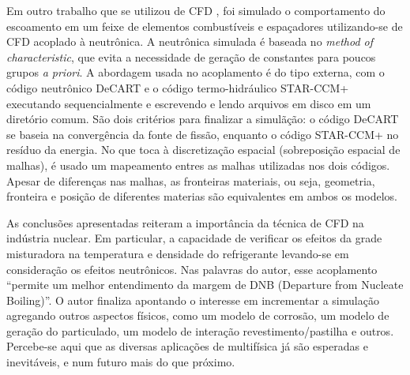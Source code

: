 Em outro trabalho que se utilizou de CFD \cite{Yan2011}, foi simulado o comportamento do escoamento em um feixe de elementos 
combustíveis e espaçadores utilizando-se de CFD acoplado à neutrônica. A neutrônica 
simulada é baseada no \textit{method of characteristic}, que evita a necessidade de geração 
de constantes para poucos grupos \textit{a priori}. A abordagem usada no 
acoplamento é do tipo externa, com o código neutrônico DeCART e o código termo-hidráulico 
STAR-CCM+ executando sequencialmente e escrevendo e lendo arquivos em disco em um 
diretório comum. São dois critérios para finalizar a simulãção: o código DeCART se baseia 
na convergência da fonte de fissão, enquanto o código STAR-CCM+ no resíduo da energia. No que toca à 
discretização espacial (sobreposição espacial de malhas), é usado um mapeamento entres as malhas 
utilizadas nos dois códigos. Apesar de diferenças nas malhas, as fronteiras materiais, ou seja, geometria, 
fronteira e posição de diferentes materias são equivalentes em ambos os modelos.

As conclusões apresentadas reiteram a importância da técnica de CFD na indústria nuclear. Em particular, 
a capacidade de verificar os efeitos da grade misturadora na temperatura e densidade do refrigerante 
levando-se em consideração os efeitos neutrônicos. Nas palavras do autor, esse acoplamento 
``permite um melhor entendimento da margem de DNB (Departure from Nucleate Boiling)''.
O autor finaliza apontando o interesse em incrementar a simulação 
agregando outros aspectos físicos, como um modelo de corrosão, um modelo de geração do particulado, 
um modelo de interação revestimento/pastilha e outros. Percebe-se aqui que as diversas aplicações 
de multifísica já são esperadas e inevitáveis, e num futuro mais do que próximo.

